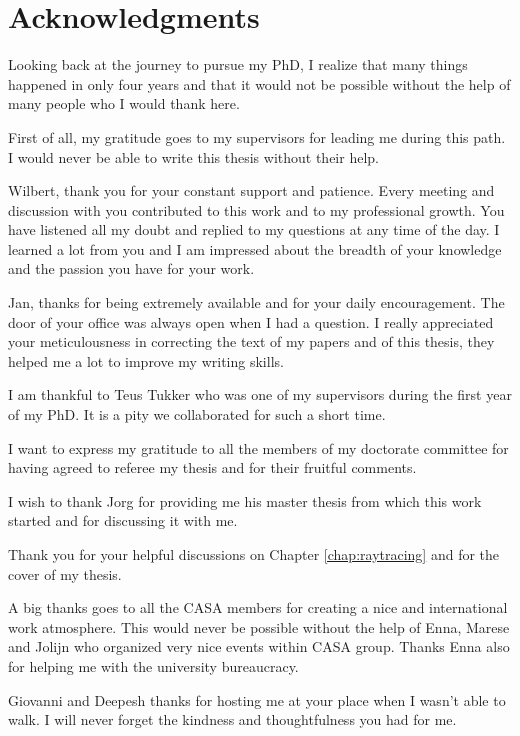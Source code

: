 \clearpage{\pagestyle{empty}\cleardoublepage}

\chapter*{Acknowledgments}
\markboth{}{}
Looking back at the journey to pursue my PhD, I realize that many things happened in only four years and that it would not be possible without the help of many people who I would thank here. 

First of all, my gratitude goes to my supervisors for leading me during this path. I would never be able to write this thesis without their help.

Wilbert, thank you for your constant support and patience. Every meeting and discussion with you contributed to this work and to my professional growth. 
You have listened all my doubt and replied to my questions at any time of the day.
I learned a lot from you and I am impressed about the breadth of your knowledge and the passion you have for your work. 

Jan, thanks for being extremely available and for your daily encouragement. The door of your office was always open when I had a question. 
I really appreciated your meticulousness in correcting the text of my papers and of this thesis, they helped me a lot to improve my writing skills.

I am thankful to Teus Tukker who was one of my supervisors during the first year of my PhD. It is a pity we collaborated for such a short time.

I want to express my gratitude to all the members of my doctorate committee for having agreed to referee my thesis and for their fruitful comments.  

I wish to thank Jorg for providing me his master thesis from which this work started and for discussing it with me.

Thank you for your helpful discussions on Chapter \ref{chap:raytracing} and for the cover of my thesis. 

A big thanks goes to all the CASA members for creating a nice and international work atmosphere. This would never be possible without the help of Enna, Marese and Jolijn who organized very nice events within CASA group. Thanks Enna also for helping me with the university bureaucracy.


Giovanni and Deepesh thanks for hosting me at your place when I wasn't able to walk. I will never forget the kindness and thoughtfulness you had for me.

